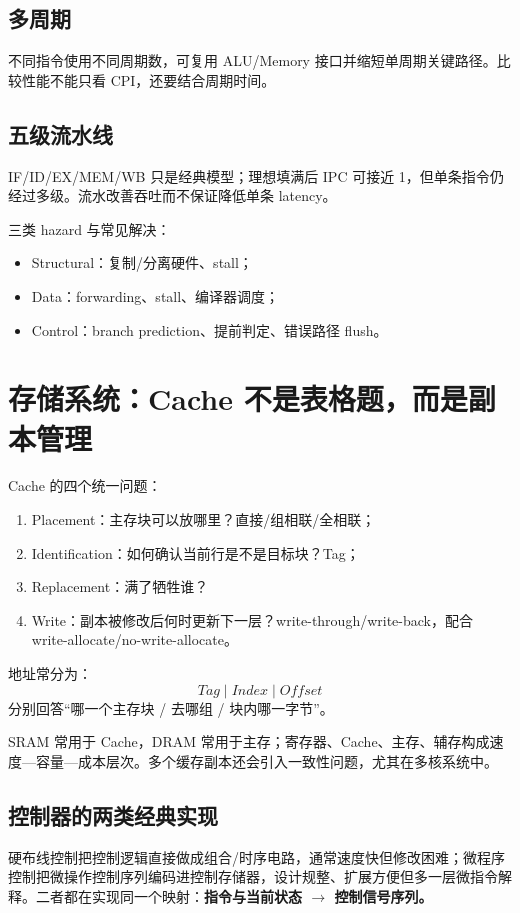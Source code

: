 \documentclass[11pt,a4paper,openany]{ctexbook}
\begin{document}
\subsection{多周期}
不同指令使用不同周期数，可复用 ALU/Memory 接口并缩短单周期关键路径。比较性能不能只看 CPI，还要结合周期时间。

\subsection{五级流水线}
IF/ID/EX/MEM/WB 只是经典模型；理想填满后 IPC 可接近 1，但单条指令仍经过多级。流水改善吞吐而不保证降低单条 latency。

三类 hazard 与常见解决：
\begin{itemize}
  \item Structural：复制/分离硬件、stall；
  \item Data：forwarding、stall、编译器调度；
  \item Control：branch prediction、提前判定、错误路径 flush。
\end{itemize}

\section{存储系统：Cache 不是表格题，而是副本管理}
Cache 的四个统一问题：
\begin{enumerate}
  \item Placement：主存块可以放哪里？直接/组相联/全相联；
  \item Identification：如何确认当前行是不是目标块？Tag；
  \item Replacement：满了牺牲谁？
  \item Write：副本被修改后何时更新下一层？write-through/write-back，配合 write-allocate/no-write-allocate。
\end{enumerate}
地址常分为：
\[
\boxed{Tag\mid Index\mid Offset}
\]
分别回答“哪一个主存块 / 去哪组 / 块内哪一字节”。

SRAM 常用于 Cache，DRAM 常用于主存；寄存器、Cache、主存、辅存构成速度—容量—成本层次。多个缓存副本还会引入一致性问题，尤其在多核系统中。


\subsection{控制器的两类经典实现}
硬布线控制把控制逻辑直接做成组合/时序电路，通常速度快但修改困难；微程序控制把微操作控制序列编码进控制存储器，设计规整、扩展方便但多一层微指令解释。二者都在实现同一个映射：\textbf{指令与当前状态 $\rightarrow$ 控制信号序列。}
\end{document}
